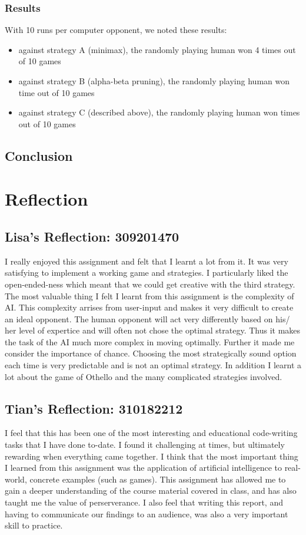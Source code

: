 \documentclass[12pt]{article}
\begin{document}
\subsubsection{Results}
With 10 runs per computer opponent, we noted these results:
\begin{itemize}
 \item against strategy A (minimax), the randomly playing human won 4 times out of 10 games
 \item against strategy B (alpha-beta pruning), the randomly playing human won time out of 10 games
 \item against strategy C (described above), the randomly playing human won times out of 10 games
\end{itemize}

\subsection{Conclusion}

\section{Reflection}

\subsection{Lisa's Reflection: 309201470}
I really enjoyed this assignment and felt that I learnt a lot from it. It was very satisfying to implement a working game and strategies. I particularly liked the open-ended-ness which meant that we could get creative with the third strategy. The most valuable thing I felt I learnt from this assignment is the complexity of AI. This complexity arrises from user-input and makes it very difficult to create an ideal opponent. The human opponent will act very differently based on his/ her level of expertice and will often not chose the optimal strategy. Thus it makes the task of the AI much more complex in moving optimally. Further it made me consider the importance of chance. Choosing the most strategically sound option each time is very predictable and is not an optimal strategy. In addition I learnt a lot about the game of Othello and the many complicated strategies involved.

\subsection{Tian's Reflection: 310182212}
I feel that this has been one of the most interesting and educational code-writing tasks that I have done to-date.
I found it challenging at times, but ultimately rewarding when everything came together. I think that the most
important thing I learned from this assignment was the application of artificial intelligence to real-world, concrete
examples (such as games). This assignment has allowed me to gain a deeper understanding of the course material
covered in class, and has also taught me the value of perserverance. I also feel that writing this report, and 
having to communicate our findings to an audience, was also a very important skill to practice.
\end{document}
